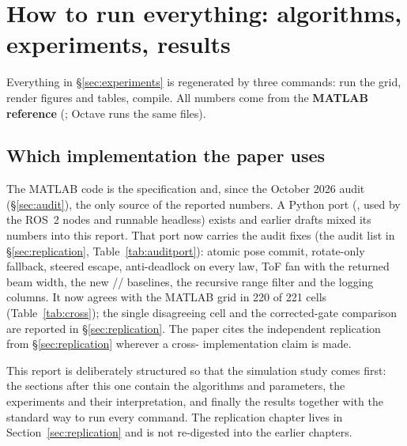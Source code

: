 
\section{How to run everything: algorithms, experiments, results}
\label{sec:howto}

Everything in \S\ref{sec:experiments} is regenerated by three commands: run
the grid, render figures and tables, compile. All numbers come from the
\textbf{MATLAB reference} (; Octave runs the same files).

\subsection{Which implementation the paper uses}
\label{sec:twostacks}

The MATLAB code is the specification and, since the October 2026 audit
(\S\ref{sec:audit}), the only source of the reported numbers. A Python port
(, used by the ROS~2 nodes and runnable
headless) exists and earlier drafts mixed its numbers into this report.
That port now carries the audit fixes (the audit list in
\S\ref{sec:replication}, Table~\ref{tab:auditport}): atomic pose commit,
rotate-only fallback, steered escape, anti-deadlock on every law, ToF fan
with the returned beam width, the new //
baselines, the recursive range filter and the logging columns. It now
agrees with the MATLAB grid in 220 of 221 cells
(Table~\ref{tab:cross}); the single disagreeing cell and the corrected-gate
comparison are reported in \S\ref{sec:replication}. The paper cites the
independent replication from \S\ref{sec:replication} wherever a cross-
implementation claim is made.
\bigskip

This report is deliberately structured so that the simulation study comes
first: the sections after this one contain the algorithms and parameters,
the experiments and their interpretation, and finally the results together
with the standard way to run every command. The replication chapter lives in
Section~\ref{sec:replication} and is not re-digested into the earlier
chapters.
